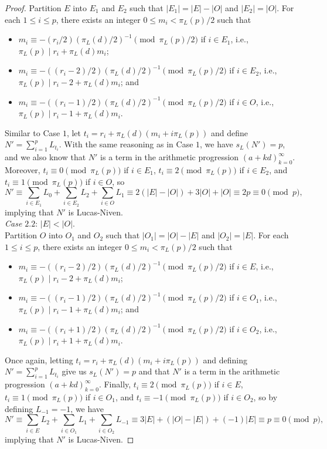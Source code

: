\documentclass[12pt]{article}
\theoremstyle{definition}
\begin{document}
\begin{proof}
Partition $E$ into $E_1$ and $E_2$ such that $|E_1|=|E|-|O|$ and $|E_2|=|O|$. For each $1\leq i\leq p$, there exists an integer $0\leq m_i<\pi_L(p)/2$ such that
\begin{itemize}
\item $m_i\equiv-(r_i/2)(\pi_L(d)/2)^{-1}\pmod{\pi_L(p)/2}$ if $i\in E_1$, i.e., $\pi_L(p)\mid r_i+\pi_L(d)m_i$;
\item $m_i\equiv-((r_i-2)/2)(\pi_L(d)/2)^{-1}\pmod{\pi_L(p)/2}$ if $i\in E_2$, i.e., $\pi_L(p)\mid r_i-2+\pi_L(d)m_i$; and
\item $m_i\equiv-((r_i-1)/2)(\pi_L(d)/2)^{-1}\pmod{\pi_L(p)/2}$ if $i\in O$, i.e., $\pi_L(p)\mid r_i-1+\pi_L(d)m_i$.
\end{itemize}
Similar to Case $1$, let $t_i=r_i+\pi_L(d)(m_i+i\pi_L(p))$ and define $N'=\sum_{i=1}^pL_{t_i}$. With the same reasoning as in Case $1$, we have $s_L(N')=p$, and we also know that $N'$ is a term in the arithmetic progression $(a+kd)_{k=0}^\infty$. Moreover, $t_i\equiv0\pmod{\pi_L(p)}$ if $i\in E_1$, $t_i\equiv2\pmod{\pi_L(p)}$ if $i\in E_2$, and $t_i\equiv1\pmod{\pi_L(p)}$ if $i\in O$, so
\[N'\equiv\sum_{i\in E_1}L_0+\sum_{i\in E_2}L_2+\sum_{i\in O}L_1\equiv2(|E|-|O|)+3|O|+|O|\equiv2p\equiv0\pmod{p},\]
implying that $N'$ is Lucas-Niven.\\

\noindent\textit{Case $2.2$}: $|E|<|O|$.\\

Partition $O$ into $O_1$ and $O_2$ such that $|O_1|=|O|-|E|$ and $|O_2|=|E|$. For each $1\leq i\leq p$, there exists an integer $0\leq m_i<\pi_L(p)/2$ such that
\begin{itemize}
\item $m_i\equiv-((r_i-2)/2)(\pi_L(d)/2)^{-1}\pmod{\pi_L(p)/2}$ if $i\in E$, i.e., $\pi_L(p)\mid r_i-2+\pi_L(d)m_i$;
\item $m_i\equiv-((r_i-1)/2)(\pi_L(d)/2)^{-1}\pmod{\pi_L(p)/2}$ if $i\in O_1$, i.e., $\pi_L(p)\mid r_i-1+\pi_L(d)m_i$; and
\item $m_i\equiv-((r_i+1)/2)(\pi_L(d)/2)^{-1}\pmod{\pi_L(p)/2}$ if $i\in O_2$, i.e., $\pi_L(p)\mid r_i+1+\pi_L(d)m_i$.
\end{itemize}
Once again, letting $t_i=r_i+\pi_L(d)(m_i+i\pi_L(p))$ and defining $N'=\sum_{i=1}^pL_{t_i}$ give us $s_L(N')=p$ and that $N'$ is a term in the arithmetic progression $(a+kd)_{k=0}^\infty$. Finally, $t_i\equiv2\pmod{\pi_L(p)}$ if $i\in E$, $t_i\equiv1\pmod{\pi_L(p)}$ if $i\in O_1$, and $t_i\equiv-1\pmod{\pi_L(p)}$ if $i\in O_2$, so by defining $L_{-1}=-1$, we have
\[N'\equiv\sum_{i\in E}L_2+\sum_{i\in O_1}L_1+\sum_{i\in O_2}L_{-1}\equiv3|E|+(|O|-|E|)+(-1)|E|\equiv p\equiv0\pmod{p},\]
implying that $N'$ is Lucas-Niven.
\end{proof}
\end{document}
